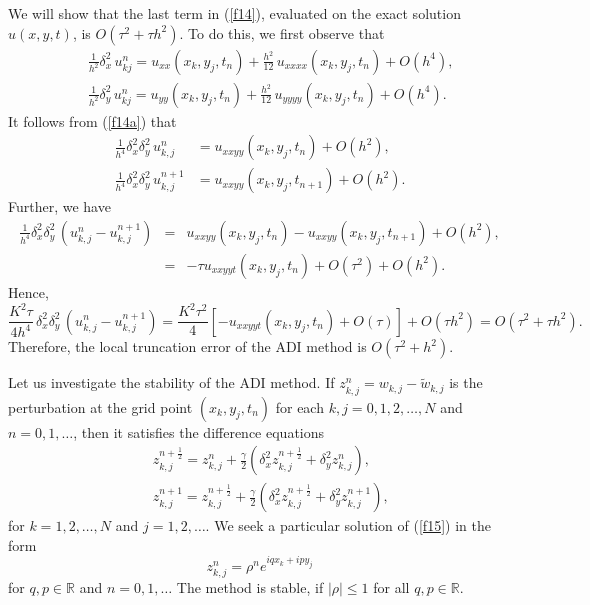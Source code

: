 \vskip 0.3cm
 
We will show that the last term in
(\ref{f14}), evaluated on the exact solution $u(x,y,t)$, is $O(\tau^2+\tau h^2)$. To do this, we first observe that
\begin{eqnarray}
&&\frac{1}{h^2}\delta_{x}^2 \, u_{kj}^n=u_{xx}(x_k,y_j,t_n)
+\frac{h^2}{12} \, u_{xxxx}(x_k,y_j,t_n)+O(h^4), \nonumber \\
&&\frac{1}{h^2}\delta_{y}^2 \, u_{kj}^n=u_{yy}(x_k,y_j,t_n)
+\frac{h^2}{12} \, u_{yyyy}(x_k,y_j,t_n)+O(h^4). \label{f14a}
\end{eqnarray}
It follows from (\ref{f14a}) that
\[\begin{split}
\frac{1}{h^4}\delta^2_{x}\delta^2_{y}\, u^{n}_{k,j}&=u_{xxyy}(x_k,y_j,t_n)
+O(h^2), \\
\frac{1}{h^4}\delta^2_{x}\delta^2_{y}\, u^{n+1}_{k,j}&=u_{xxyy}(x_k,y_j,t_{n+1})
+O(h^2).
\end{split}\]
Further, we have
\begin{eqnarray}
\frac{1}{h^4}\delta^2_{x}\delta^2_{y}\, \left( u^{n}_{k,j}-u^{n+1}_{k,j}\right) &=& u_{xxyy}(x_k,y_j,t_n)-u_{xxyy}(x_k,y_j,t_{n+1})
+O(h^2), \nonumber \\
&=&-\tau u_{xxyyt}(x_k,y_j,t_n) +O(\tau^2)+O(h^2). \label{ff14c}
\end{eqnarray}
Hence,
\[
\frac{K^2\tau}{4h^4} \, \delta^2_{x}\delta^2_{y}\, \left(u^{n}_{k,j}-u^{n+1}_{k,j}\right)=
\frac{K^2\tau^2}{4}\left[-u_{xxyyt}(x_k,y_j,t_n)+O(\tau)\right]+O(\tau h^2)=O(\tau^2+\tau h^2).
\]
Therefore, the local truncation error
of the ADI method is $O(\tau^2+h^2)$.

\vskip 0.5cm
 
Let us investigate the stability of the ADI method. If
$z^{n}_{k,j}=w_{k,j}-\tilde{w}_{k,j}$ is
the perturbation at the grid point $(x_{k}, y_{j}, t_{n})$ for each $k,j=0,1,2, \dots, N$
and $n=0,1, \dots$, then it satisfies the difference equations
\begin{eqnarray}
&&z^{n+\frac{1}{2}}_{k,j}=z^{n}_{k,j}+\frac{\gamma}{2}
\left(\delta^2_{x}z^{n+\frac{1}{2}}_{k,j}
+\delta^2_{y}z^{n}_{k,j}\right), \nonumber \\
&&z^{n+1}_{k,j}=z^{n+\frac{1}{2}}_{k,j}+\frac{\gamma}{2}
\left(\delta^2_{x}z^{n+\frac{1}{2}}_{k,j}
+\delta^2_{y}z^{n+1}_{k,j}\right), \label{f15}
\end{eqnarray}
for $k=1,2, \dots, N$ and $j=1, 2, \dots$. We seek a particular solution of
(\ref{f15}) in the form
\[
z^{n}_{k,j}=\rho^{n}e^{iqx_{k}+ipy_{j}}
\]
for $q,p\in{\mathbb R}$ and $n=0,1,\dots$
The method is stable, if $\vert\rho\vert\leq 1$ for all $q,p\in{\mathbb R}$.

